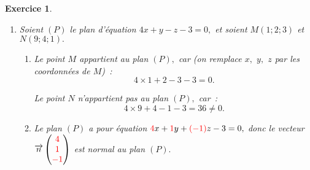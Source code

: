 \documentclass[10pt]{article}
\newtheorem{exo}{Exercice}
\begin{document}
\begin{exo}
\begin{enumerate}
On calcule donc, avec les formules habituelles~:
\begin{align*}
&I\left(\frac{x_A+x_B}{2};\frac{y_A+y_B}{2};\frac{z_A+z_B}{2}\right)\qquad
I\left(\frac{2+2}{2};\frac{-1+5}{2};\frac{3+0}{2}\right)\qquad
I(2;2;1,5),\\
&\overrightarrow{AB}\begin{pmatrix} x_B-x_A\\y_B-y_A\\z_B-z_A\end{pmatrix}\qquad
\overrightarrow{AB}\begin{pmatrix} 2-2\\5-(-1)\\0-3\end{pmatrix}\qquad\overrightarrow{AB}\begin{pmatrix} 0\\6\\-3\end{pmatrix}~\textcolor{red}{\begin{matrix}a\\b\\c\end{matrix}}~.\end{align*}

Le plan $P$ a donc une équation de la forme \[0x+6y-3z+d=0.\] Et comme il passe par $I~:$
\begin{align*}
0\times 2+6\times 2-3\times 1,5+d&=0\\
7,5+d&=0\\
d&=-7,5.\end{align*}

Conclusion~:
\[P:6y-3z-7,5=0.\]

\medskip

\textbf{Remarque~:} En multipliant par $\frac{2}{3},$ on a une écriture plus agréable~: $P:4y-2z-5=0.$

\item Soient $(P)$ le plan d'équation $4x+y-z-3=0,$ et soient $M(1;2;3)$ et $N(9;4;1).$

\begin{enumerate}
\item Le point $M$ appartient au plan $(P),$ car (on remplace $x,$ $y,$ $z$ par les coordonnées de $M$)~:
\[4\times 1+2-3-3=0.\]

\medskip

Le point $N$ n'appartient pas au plan $(P),$ car~:
\[4\times 9+4-1-3=36\not=0.\]


\item Le plan $(P)$ a pour équation $\textcolor{red}{4}x+\textcolor{red}{1}y+\textcolor{red}{(-1)}z-3=0,$ donc le vecteur $\overrightarrow{n}\begin{pmatrix}\textcolor{red}{4}\\ \textcolor{red}{1}\\ \textcolor{red}{-1}\end{pmatrix}$ est normal au plan $(P).$


\end{enumerate}
\end{enumerate}
\end{exo}
\end{document}
